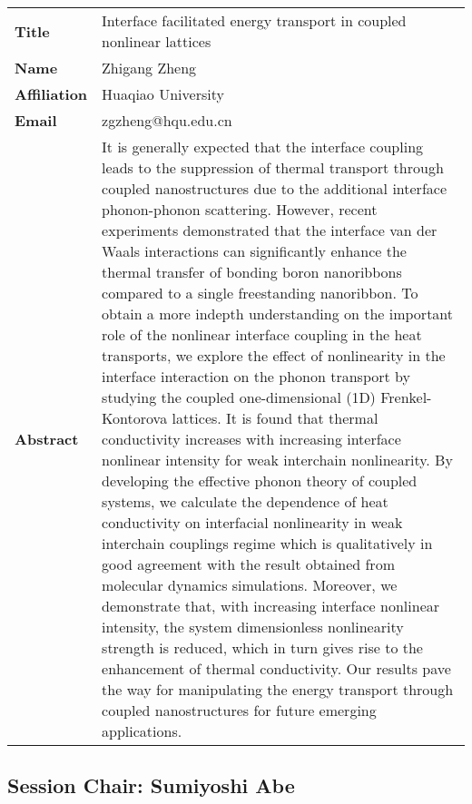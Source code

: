 \documentclass[oneside,A4paper,12pt]{article}
\begin{document}
\newpage

\begin{longtable}{p{2cm}p{14cm}}
\toprule
\textbf{Title} & Interface facilitated energy transport in coupled nonlinear lattices\\
\textbf{Name} & Zhigang Zheng\\
\textbf{Affiliation} & Huaqiao University\\
\textbf{Email} & zgzheng@hqu.edu.cn\\
\textbf{Abstract} & It is generally expected that the interface coupling leads to the suppression of thermal transport through coupled nanostructures due to the additional interface phonon-phonon scattering. However, recent experiments demonstrated that the interface van der Waals interactions can significantly enhance the thermal transfer of bonding boron nanoribbons compared to a single freestanding nanoribbon. To obtain a more indepth understanding on the important role of the nonlinear interface coupling in the heat transports, we explore the effect of nonlinearity in the interface interaction on the phonon transport by studying the coupled one-dimensional (1D) Frenkel-Kontorova lattices. It is found that thermal conductivity increases with increasing interface nonlinear intensity for weak interchain nonlinearity. By developing the effective phonon theory of coupled systems, we calculate the dependence of heat conductivity on interfacial nonlinearity in weak interchain couplings regime which is qualitatively in good agreement with the result obtained from molecular dynamics simulations. Moreover, we demonstrate that, with increasing interface nonlinear intensity, the system dimensionless nonlinearity strength is reduced, which in turn gives rise to the enhancement of thermal conductivity. Our results pave the way for manipulating the energy transport through coupled nanostructures for future emerging applications.\\
\bottomrule
\end{longtable}

\newpage

\subsection*{Session \uppercase\expandafter{}  \hspace{10mm} Chair: Sumiyoshi Abe}
\label{sec:org7e3a858}
\end{document}

